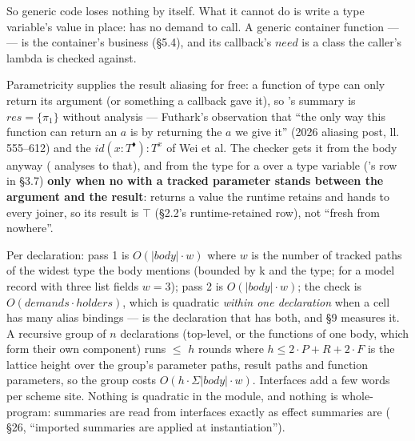 So generic code loses nothing by itself. What it cannot do is write a type variable's value in place:  has no demand to call. A generic container function —  — is the container's business (§5.4), and its callback's $\mathit{need}$ is a class the caller's lambda is checked against.

Parametricity supplies the result aliasing for free: a function of type  can only return its argument (or something a callback gave it), so 's summary is $\mathit{res}=\{\pi _{1}\}$ without analysis — Futhark's observation that “the only way this function can return an $a$ is by returning the $a$ we give it” (2026 aliasing post, ll. 555–612) and the $\mathit{id}(x:T^{\blacklozenge}):T^{x}$ of Wei et al. The checker gets it from the body anyway ( analyses to that), and from the type for a  over a type variable ('s row in  §3.7) \textbf{only when no  with a tracked parameter stands between the argument and the result}:  returns a value the runtime retains and hands to every joiner, so its result is $\top$ (§2.2's runtime-retained row), not “fresh from nowhere”.


Per declaration: pass 1 is $O(\lvert\mathit{body}\rvert\cdot w)$ where $w$ is the number of tracked paths of the widest type the body mentions (bounded by k and the type; for a model record with three list fields $w=3$); pass 2 is $O(\lvert\mathit{body}\rvert\cdot w)$; the check is $O(\mathit{demands}\cdot\mathit{holders})$, which is quadratic \emph{within one declaration} when a cell has many alias bindings —  is the declaration that has both, and §9 measures it. A recursive group of $n$ declarations (top-level, or the  functions of one body, which form their own component) runs $\le$ $h$ rounds where $h \le 2\cdot P + R + 2\cdot F$ is the lattice height over the group's parameter paths, result paths and function parameters, so the group costs $O(h\cdot\Sigma\lvert\mathit{body}\rvert\cdot w)$. Interfaces add a few words per scheme site. Nothing is quadratic in the module, and nothing is whole-program: summaries are read from interfaces exactly as effect summaries are ( §26, “imported summaries are applied at instantiation”).

